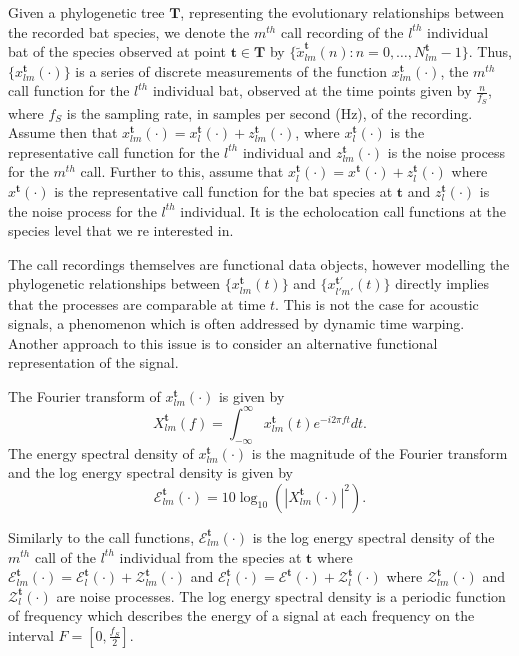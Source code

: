 \documentclass[wsdraft]{ws-rv9x6} %
\begin{document}
Given a phylogenetic tree \(\mathbf{T}\), representing the evolutionary relationships between the recorded bat species, we denote the \(m^{th}\) call recording of the \(l^{th}\) individual bat of the species observed at point \(\mathbf{t} \in \mathbf{T}\) by \(\{\tilde{x}_{lm}^{\mathbf{t}}(n) : n = 0, \dots, N_{lm}^{\mathbf{t}} - 1\}\). 
Thus, \(\{x_{lm}^{\mathbf{t}}(\cdot)\}\) is a series of discrete measurements of the function \(x_{lm}^{\mathbf{t}}(\cdot)\), the \(m^{th}\) call function for the \(l^{th}\) individual bat, observed at the time points given by \(\frac{n}{f_S}\), where \(f_S\) is the sampling rate, in samples per second (Hz), of the recording. Assume then that \(x_{lm}^{\mathbf{t}}(\cdot) = x_{l}^{\mathbf{t}}(\cdot) + z_{lm}^{\mathbf{t}}(\cdot)\), where \(x_{l}^{\mathbf{t}}(\cdot)\) is the representative call function for the \(l^{th}\) individual and \(z_{lm}^{\mathbf{t}}(\cdot)\) is the noise process for the \(m^{th}\) call. Further to this, assume that \(x_{l}^{\mathbf{t}}(\cdot) = x^{\mathbf{t}}(\cdot) + z_{l}^{\mathbf{t}}(\cdot)\) where \(x^{\mathbf{t}}(\cdot)\) is the representative call function for the bat species at \({\mathbf{t}}\) and \(z_{l}^{\mathbf{t}}(\cdot)\) is the noise process for the \(l^{th}\) individual. It is the echolocation call functions at the species level that we re interested in.

The call recordings themselves are functional data objects, however modelling the phylogenetic relationships between \(\{x_{lm}^{\mathbf{t}}(t)\}\) and \(\{x_{l'm'}^{{\mathbf{t}}'}(t)\}\) directly implies that the processes are comparable at time \(t\). 
This is not the case for acoustic signals, a phenomenon which is often addressed by dynamic time warping.\cite{berndt1994using} Another approach to this issue is to consider an alternative functional representation of the signal. 

The Fourier transform of \(x_{lm}^{\mathbf{t}}(\cdot)\) is given by
\[
X_{lm}^{\mathbf{t}}(f) = \int_{-\infty}^{\infty} x_{lm}^{\mathbf{t}}(t) e^{-i 2\pi f t} dt.
\label{eqn:dft}
\]
The energy spectral density of \(x_{lm}^{\mathbf{t}}(\cdot)\) is the magnitude of the Fourier transform and the log energy spectral density is given by
\begin{equation}
\mathcal{E}_{lm}^{\mathbf{t}}(\cdot) = 10 \log_{10} \left( |X_{lm}^{\mathbf{t}}(\cdot)|^2 \right).
\label{eqn:esd}
\end{equation}

Similarly to the call functions, \(\mathcal{E}_{lm}^{\mathbf{t}}(\cdot)\) is the log energy spectral density of the \(m^{th}\) call of the \(l^{th}\) individual from the species at \({\mathbf{t}}\) where \(\mathcal{E}_{lm}^{\mathbf{t}}(\cdot) = \mathcal{E}_{l}^{\mathbf{t}}(\cdot) + \mathcal{Z}_{lm}^{\mathbf{t}}(\cdot)\) and \(\mathcal{E}_{l}^{\mathbf{t}}(\cdot) = \mathcal{E}^{\mathbf{t}}(\cdot) + \mathcal{Z}_{l}^{\mathbf{t}}(\cdot)\) where \(\mathcal{Z}_{lm}^{\mathbf{t}}(\cdot)\) and \(\mathcal{Z}_{l}^{\mathbf{t}}(\cdot)\) are noise processes.  The log energy spectral density is a periodic function of frequency which describes the energy of a signal at each frequency on the interval \(F = [0, \frac{f_S}{2}]\).\cite{antoniou2006digital}
\end{document}

